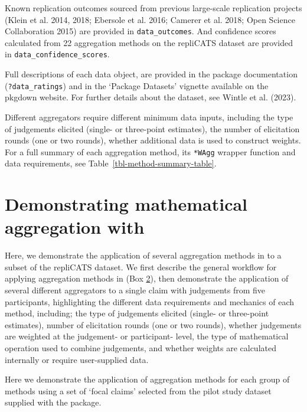 \documentclass[
  11pt,
  a4paper,
]{article}
\begin{document}
Known replication outcomes sourced from previous large-scale replication
projects ({Klein et al.} 2014, 2018; {Ebersole et al.} 2016; Camerer et
al. 2018; Open Science Collaboration 2015) are provided in
\texttt{data\_outcomes}. And confidence scores calculated from 22
aggregation methods on the repliCATS dataset are provided in
\texttt{data\_confidence\_scores}.

Full descriptions of each data object, are provided in the
 package documentation (\texttt{?data\_ratings}) and in
the `Package Datasets' vignette available on the  pkgdown
website. For further details about the dataset, see Wintle et al.
(2023).

Different aggregators require different minimum data inputs, including
the type of judgements elicited (single- or three-point estimates), the
number of elicitation rounds (one or two rounds), whether additional
data is used to construct weights. For a full summary of each
aggregation method, its \texttt{*WAgg} wrapper function and data
requirements, see Table~\ref{tbl-method-summary-table}.

\section{\texorpdfstring{Demonstrating mathematical aggregation with
}{Demonstrating mathematical aggregation with }}\label{sec-examples}

Here, we demonstrate the application of several aggregation methods in
 to a subset of the repliCATS dataset. We first describe
the general workflow for applying aggregation methods in 
(Box \hyperref[aggWorkflow]{2}), then demonstrate the application of
several different aggregators to a single claim with judgements from
five participants, highlighting the different data requirements and
mechanics of each method, including; the type of judgements elicited
(single- or three-point estimates), number of elicitation rounds (one or
two rounds), whether judgements are weighted at the judgement- or
participant- level, the type of mathematical operation used to combine
judgements, and whether weights are calculated internally or require
user-supplied data.

Here we demonstrate the application of aggregation methods for each
group of methods using a set of `focal claims' selected from the pilot
study dataset supplied with the  package.
\end{document}
